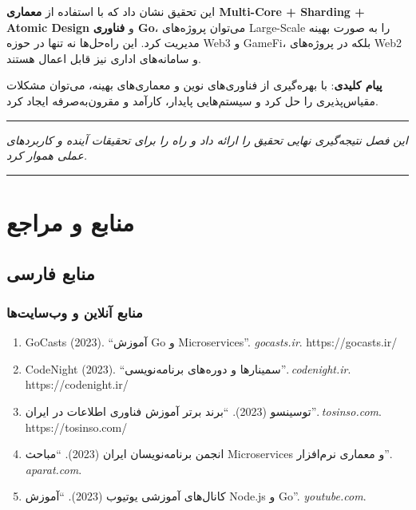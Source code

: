 \documentclass[
]{article}
\begin{document}
این تحقیق نشان داد که با استفاده از \textbf{معماری Multi-Core + Sharding
+ Atomic Design} و \textbf{فناوری Go}، می‌توان پروژه‌های Large-Scale را به
صورت بهینه مدیریت کرد. این راه‌حل‌ها نه تنها در حوزه Web3 و GameFi، بلکه
در پروژه‌های Web2 و سامانه‌های اداری نیز قابل اعمال هستند.

\textbf{پیام کلیدی}: با بهره‌گیری از فناوری‌های نوین و معماری‌های بهینه،
می‌توان مشکلات مقیاس‌پذیری را حل کرد و سیستم‌هایی پایدار، کارآمد و
مقرون‌به‌صرفه ایجاد کرد.

\begin{center}\rule{0.5\linewidth}{0.5pt}\end{center}

\emph{این فصل نتیجه‌گیری نهایی تحقیق را ارائه داد و راه را برای تحقیقات
آینده و کاربردهای عملی هموار کرد.}

\begin{center}\rule{0.5\linewidth}{0.5pt}\end{center}

\section{منابع و
مراجع}\label{ux645ux646ux627ux628ux639-ux648-ux645ux631ux627ux62cux639}

\subsection{منابع
فارسی}\label{ux645ux646ux627ux628ux639-ux641ux627ux631ux633ux6cc}

\subsubsection{منابع آنلاین و
وب‌سایت‌ها}\label{ux645ux646ux627ux628ux639-ux622ux646ux644ux627ux6ccux646-ux648-ux648ux628ux633ux627ux6ccux62aux647ux627}

\begin{enumerate}
\def\labelenumi{\arabic{enumi}.}
\item
  GoCasts (2023). ``آموزش Go و Microservices''. \emph{gocasts.ir}.
  https://gocasts.ir/
\item
  CodeNight (2023). ``سمینارها و دوره‌های برنامه‌نویسی''.
  \emph{codenight.ir}. https://codenight.ir/
\item
  توسینسو (2023). ``برند برتر آموزش فناوری اطلاعات در ایران''.
  \emph{tosinso.com}. https://tosinso.com/
\item
  انجمن برنامه‌نویسان ایران (2023). ``مباحث Microservices و معماری
  نرم‌افزار''. \emph{aparat.com}.
\item
  کانال‌های آموزشی یوتیوب (2023). ``آموزش Node.js و Go''.
  \emph{youtube.com}.
\end{enumerate}
\end{document}
